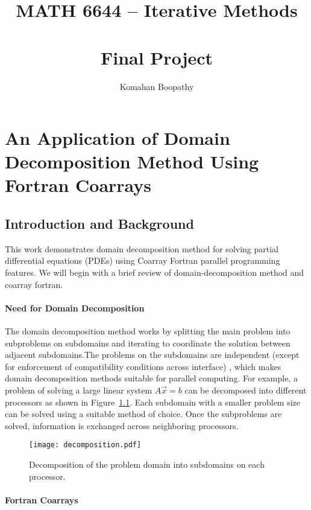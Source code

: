 \documentclass[12pt]{report}
\title{\textbf{MATH 6644 -- Iterative Methods \\~ \\ Final Project}}
\author{Komahan Boopathy}
\begin{document}
\maketitle
\chapter{An Application of Domain Decomposition Method Using Fortran Coarrays}

\section{Introduction and Background}

This work demonstrates domain decomposition method for solving partial
differential equations (PDEs) using Coarray Fortran parallel
programming features. We will begin with a brief review of
domain-decomposition method and coarray fortran.

\subsubsection{Need for Domain Decomposition}

The domain decomposition method works by splitting the main problem
into subproblems on subdomains and iterating to coordinate the
solution between adjacent subdomains.The problems on the subdomains
are independent (except for enforcement of compatibility conditions
across interface) , which makes domain decomposition methods suitable
for parallel computing. For example, a problem of solving a large
linear system $A\vec{x}=b$ can be decomposed into different processors as
shown in Figure~\ref{fig:decomposition}.  Each subdomain with a
smaller problem size can be solved using a suitable method of
choice. Once the subproblems are solved, information is exchanged
across neighboring processors.  %

\begin{figure}[H]
  \centering
  \texttt{[image: decomposition.pdf]}    
  \caption{Decomposition of the problem domain into subdomains on each
    processor.}
  \label{fig:decomposition}
\end{figure}

\subsubsection{Fortran Coarrays}
\end{document}
